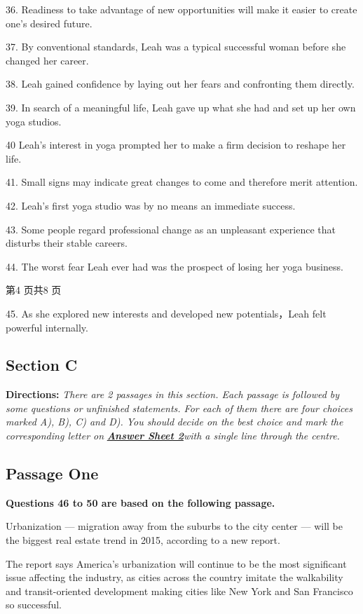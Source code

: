 \documentclass[UTF8,11pt]{ctexart}
\begin{document}
36. Readiness to take advantage of new opportunities will make it easier to create one’s desired future.


37. By conventional standards, Leah was a typical successful woman before she changed her career.


38. Leah gained confidence by laying out her fears and confronting them directly.


39. In search of a meaningful life, Leah gave up what she had and set up her own yoga studios.


40 Leah's interest in yoga prompted her to make a firm decision to reshape her life.


41. Small signs may indicate great changes to come and therefore merit attention.


42. Leah’s first yoga studio was by no means an immediate success.


43. Some people regard professional change as an unpleasant experience that disturbs their stable careers.


44. The worst fear Leah ever had was the prospect of losing her yoga business.


第4 页共8 页


45. As she explored new interests and developed new potentials，Leah felt powerful internally.


\subsection*{\textbf{Section C}}


\textbf{Directions:}\textit{ There are 2 passages in this section. Each passage is followed by some questions or} \textit{unfinished statements. For each of them there are four choices marked A), B), C) and D). You should} \textit{decide on the best choice and mark the corresponding letter on}\textbf{\textit{ }}\textbf{\textit{\uline{Answer Sheet 2}}}\textit{with a single line through} \textit{the centre.}


\subsection*{\textbf{Passage One}}


\textbf{Questions 46 to 50 are based on the following passage.}


Urbanization — migration away from the suburbs to the city center — will be the biggest real estate trend in 2015, according to a new report.


The report says America’s urbanization will continue to be the most significant issue affecting the industry, as cities across the country imitate the walkability and transit-oriented development making cities like New York and San Francisco so successful.
\end{document}
